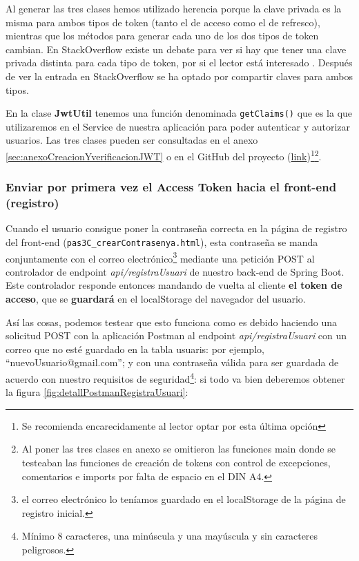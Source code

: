 \documentclass[a4paper,12pt]{report}
\begin{document}
		
		
		
		
		Al generar las tres clases hemos utilizado herencia porque la clave privada es la misma para ambos tipos de token (tanto el de acceso como el de refresco), mientras que los métodos para generar cada uno de los dos tipos de token cambian. En StackOverflow existe un debate para ver si hay que tener una clave privada distinta para cada tipo de token, por si el lector está interesado \cite{stackoverflow_jwt_refresh_token_secret}. Después de ver la entrada en StackOverflow se ha optado por compartir claves para ambos tipos.
		
		
		En la clase \textbf{JwtUtil} tenemos una función denominada \texttt{getClaims()} que es la que utilizaremos en el Service de nuestra aplicación para poder autenticar y autorizar usuarios. Las tres clases pueden ser consultadas en el anexo \ref{sec:anexoCreacionYverificacionJWT} o en el GitHub del proyecto (\href{https://github.com/blackcub3s/mercApp/blob/main/APP%20WEB/__springboot__produccio__/app/src/main/java/miApp/app/seguretat/jwt}{link})\footnote{Se recomienda encarecidamente al lector optar por esta última opción}\footnote{Al poner las tres clases en anexo se omitieron las funciones main donde se testeaban las funciones de creación de tokens con control de excepciones, comentarios e imports por falta de espacio en el DIN A4.}.
		
		\subsubsection{Enviar por primera vez el Access Token hacia el front-end (registro)}
		\label{sec:enviarPorPrimeraVezAccesTokenDESDEBACKEND}
		
		Cuando el usuario consigue poner la contraseña correcta en la página de registro del front-end (\texttt{pas3C\_crearContrasenya.html}), esta contraseña se manda conjuntamente con el correo electrónico\footnote{el correo electrónico  lo teníamos guardado en el localStorage de la página de registro inicial.}  mediante una petición POST al controlador de endpoint \textit{api/registraUsuari} de nuestro back-end de Spring Boot. Este controlador responde entonces mandando de vuelta al cliente \textbf{el token de acceso}, que se \textbf{guardará} en el localStorage del navegador del usuario.
		
		
		Así las cosas, podemos testear que esto funciona como es debido haciendo una solicitud POST con la aplicación Postman\cite{postman_api_platform} al endpoint \textit{api/registraUsuari} con un correo que no esté guardado en la tabla usuaris: por ejemplo, ``nuevoUsuario@gmail.com''; y con una contraseña válida para ser guardada de acuerdo con nuestro requisitos de seguridad\footnote{Mínimo 8 caracteres, una minúscula y una mayúscula y sin caracteres peligrosos.}: si todo va bien deberemos obtener la figura \ref{fig:detallPostmanRegistraUsuari}:
		
\end{document}
